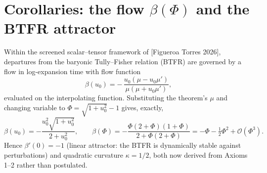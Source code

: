 \documentclass[11pt]{article}
\theoremstyle{plain}
\begin{document}
\section{Corollaries: the flow \texorpdfstring{$\beta(\Phi)$}{beta(Phi)} and the BTFR attractor}\label{sec:corollaries}

Within the screened scalar--tensor framework of [Figueroa Torres 2026], departures from the baryonic Tully--Fisher relation (BTFR) are governed by a flow in log-expansion time with flow function
\begin{equation*}\tag{8}\label{eq:8}
\beta(u_0) = -\,\frac{u_0(\mu-u_0\mu')}{\mu(\mu+u_0\mu')},
\end{equation*}
evaluated on the interpolating function. Substituting the theorem's $\mu$ and changing variable to $\Phi=\sqrt{1+u_0^2}-1$ gives, exactly,
\begin{equation*}\tag{9}\label{eq:9}
\beta(u_0) = -\frac{u_0^2\sqrt{1+u_0^2}}{2+u_0^2}, \qquad \beta(\Phi) = -\frac{\Phi(2+\Phi)(1+\Phi)}{2+\Phi(2+\Phi)} = -\Phi - \tfrac12\Phi^2 + \mathcal{O}(\Phi^3).
\end{equation*}
Hence $\beta'(0)=-1$ (linear attractor: the BTFR is dynamically stable against perturbations) and quadratic curvature $\kappa=1/2$, both now derived from Axioms 1--2 rather than postulated.
\end{document}
